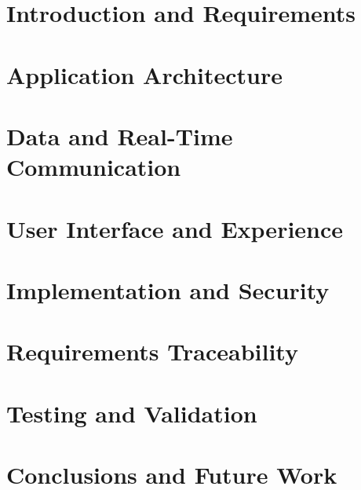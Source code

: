 \documentclass{Configuration_Files/PoliMi3i_thesis}
\begin{document}
\mainmatter %


\chapter{Introduction and Requirements}


\chapter{Application Architecture}


\chapter{Data and Real-Time Communication}


\chapter{User Interface and Experience}


\chapter{Implementation and Security}


\chapter{Requirements Traceability}


\chapter{Testing and Validation}


\chapter{Conclusions and Future Work}

\end{document}
